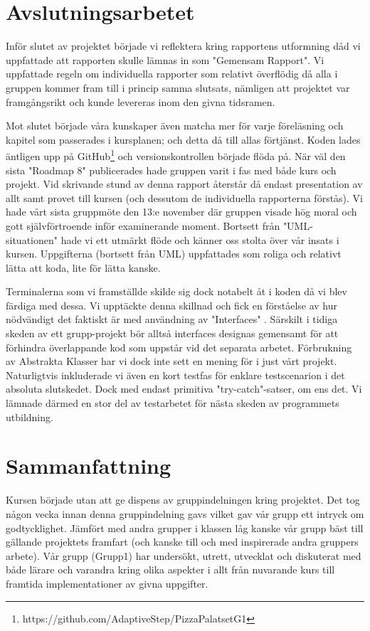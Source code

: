 \documentclass{article}
\theoremstyle{remark}                                         %
\begin{document}
\section{Avslutningsarbetet}
Inför slutet av projektet började vi reflektera kring rapportens utformning dåd vi uppfattade att rapporten skulle lämnas in som "Gemensam Rapport". Vi uppfattade regeln om individuella rapporter som relativt överflödig då alla i gruppen kommer fram till i princip samma slutsats, nämligen att projektet var framgångsrikt och kunde levereras inom den givna tidsramen.

Mot slutet började våra kunskaper även matcha mer för varje föreläsning och kapitel som passerades i kursplanen; och detta då till allas förtjänst. Koden lades äntligen upp på  GitHub\footnote{https://github.com/AdaptiveStep/PizzaPalatsetG1} 
och versionskontrollen började flöda på. När väl den sista "Roadmap 8"  publicerades hade gruppen varit i fas med både kurs och projekt. Vid skrivande stund av denna rapport återstår då endast presentation av allt samt provet till kursen (och dessutom de individuella rapporterna förstås). Vi hade vårt sista gruppmöte den 13:e november där gruppen visade hög moral och gott självförtroende inför examinerande moment. Bortsett från "UML-situationen" hade vi ett utmärkt flöde och känner oss stolta över vår insats i kursen. Uppgifterna (bortsett från UML) uppfattades som roliga och relativt lätta att koda, lite för lätta kanske. 

Terminalerna som vi framställde skilde sig dock notabelt åt i koden då vi blev färdiga med dessa. Vi upptäckte denna skillnad och fick en förståelse av hur nödvändigt det faktiskt är med användning av "Interfaces" . Särskilt i tidiga skeden av ett grupp-projekt bör alltså interfaces designas gemensamt för att förhindra överlappande kod som uppstår vid det separata arbetet. Förbrukning av Abstrakta Klasser har vi dock inte sett en mening för i just vårt projekt. Naturligtvis inkluderade vi även en kort testfas för enklare testscenarion i det absoluta slutskedet. Dock med endast primitiva  "try-catch"-satser, om ens det. Vi lämnade därmed en stor del av testarbetet för nästa skeden av programmets utbildning.

\section{Sammanfattning}
Kursen började utan att ge dispens av gruppindelningen kring projektet. Det tog någon vecka innan denna gruppindelning gavs vilket gav vår grupp ett intryck om godtycklighet. Jämfört med andra grupper i klassen låg kanske vår grupp bäst till gällande projektets framfart (och kanske till och med inspirerade andra gruppers arbete). Vår grupp (Grupp1) har undersökt, utrett, utvecklat och diskuterat med både lärare och varandra kring olika aspekter i allt från nuvarande kurs till framtida implementationer av givna uppgifter. 
\end{document}
